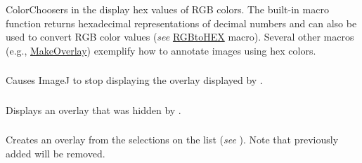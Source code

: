 \begin{infobox}
\begin{spacing}{0.75}
\begin{centering}
\par\end{centering}
\end{spacing}

\noindent ColorChoosers in the  display hex values
of RGB colors. The built-in macro function 
returns hexadecimal representations of decimal numbers and can also
be used to convert RGB color values (\emph{see} \href{http://imagejdocu.tudor.lu/doku.php?id=macro:rgbtohex}{RGBtoHEX}
macro). Several other macros (e.g., \href{http://imagej.nih.gov/ij/macros/examples/MakeOverlay.txt}{MakeOverlay})
exemplify how to annotate images using hex colors.
\end{infobox}



\subsubsection{\protect{}\label{sub:Hide-Overlay}}

Causes ImageJ to stop displaying the overlay displayed by .


\subsubsection{\protect{}\label{sub:Show-Overlay}}

Displays an overlay that was hidden by .


\subsubsection{\protect{}\label{sub:From-ROI-Manager}}

Creates an overlay from the selections
on the  list (\emph{see}
).
Note that previously added  will be removed.


\subsubsection{\protect{}\label{sub:To-ROI-Manager}}

